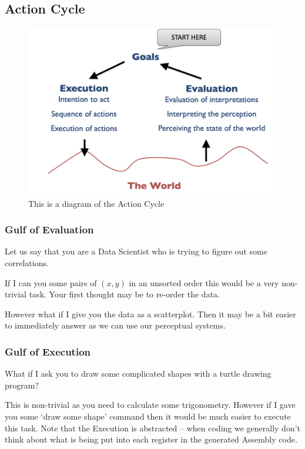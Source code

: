 \subsection{Action Cycle}
\begin{figure}[H]
    \centering
    \includegraphics[scale=0.2]{lectures/wk4/img/action_cycle.png}
    \caption{This is a diagram of the Action Cycle}
    \label{fig:action_cycle}
\end{figure}

\subsubsection{Gulf of Evaluation}
Let us say that you are a Data Scientist who is trying to figure out some correlations.

If I can you some pairs of $(x, y)$ in an unsorted order this would be a very non-trivial task. Your first thought may be to re-order the data.

However what if I give you the data as a scatterplot. Then it may be a bit easier to immediately answer as we can use our perceptual systems.

\subsubsection{Gulf of Execution}
What if I ask you to draw some complicated shapes with a turtle drawing program?

This is non-trivial as you need to calculate some trigonometry. However if I gave you some `draw some shape' command then it would be much easier to execute this task. Note that the Execution is abstracted -- when coding we generally don't think about what is being put into each register in the generated Assembly code.

